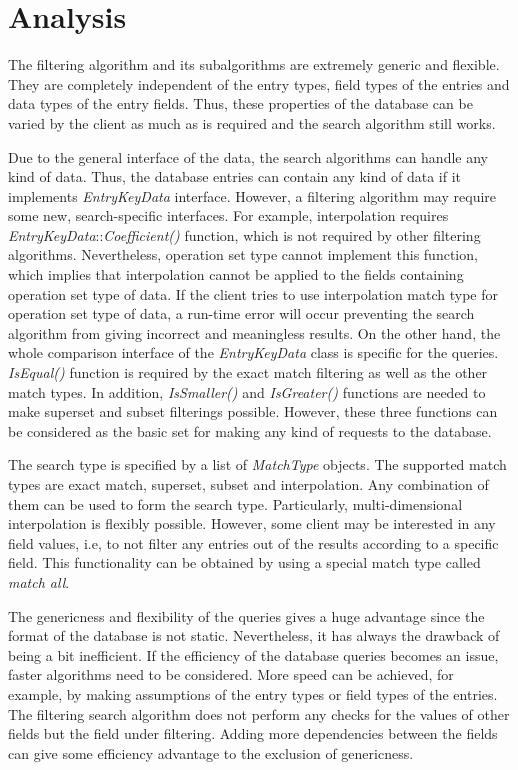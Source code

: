 \documentclass[a4paper,twoside]{tce}
\begin{document}
\section{Analysis}

The filtering algorithm and its subalgorithms are extremely generic
and flexible. They are completely independent of the entry types,
field types of the entries and data types of the entry fields. Thus,
these properties of the database can be varied by the client as much
as is required and the search algorithm still works.

Due to the general interface of the data, the search algorithms can
handle any kind of data. Thus, the database entries can contain any
kind of data if it implements \emph{EntryKeyData} interface. However,
a filtering algorithm may require some new, search-specific
interfaces. For example, interpolation requires
\emph{EntryKeyData}::\emph{Coefficient()} function, which is not
required by other filtering algorithms. Nevertheless, operation set
type cannot implement this function, which implies that interpolation
cannot be applied to the fields containing operation set type of
data. If the client tries to use interpolation match type for
operation set type of data, a run-time error will occur preventing the
search algorithm from giving incorrect and meaningless results. On the
other hand, the whole comparison interface of the \emph{EntryKeyData}
class is specific for the queries. \emph{IsEqual()} function is
required by the exact match filtering as well as the other match
types. In addition, \emph{IsSmaller()} and \emph{IsGreater()}
functions are needed to make superset and subset filterings
possible. However, these three functions can be considered as the
basic set for making any kind of requests to the database.

The search type is specified by a list of \emph{MatchType}
objects. The supported match types are exact match, superset, subset
and interpolation. Any combination of them can be used to form the
search type. Particularly, multi-dimensional interpolation is flexibly
possible. However, some client may be interested in any field values,
i.e, to not filter any entries out of the results according to a
specific field. This functionality can be obtained by using a special
match type called \emph{match all}.

The genericness and flexibility of the queries gives a huge advantage
since the format of the database is not static. Nevertheless, it has
always the drawback of being a bit inefficient. If the efficiency of
the database queries becomes an issue, faster algorithms need to be
considered. More speed can be achieved, for example, by making
assumptions of the entry types or field types of the entries. The
filtering search algorithm does not perform any checks for the values of
other fields but the field under filtering. Adding more dependencies
between the fields can give some efficiency advantage to the exclusion
of genericness.
\end{document}
